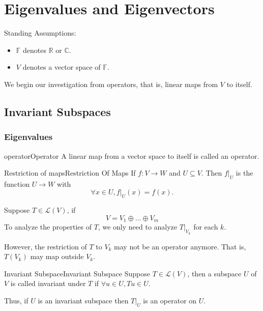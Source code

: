 \documentclass[../main.tex]{subfiles}
\begin{document}
\chapter{Eigenvalues and Eigenvectors}


\begin{plainblackenv}
Standing Assumptions:
\tcblower\par
\begin{itemize}
\item $\mathbb{F}$ denotes $\mathbb{R}$ or $\mathbb{C}$.
\item $V$ denotes a vector space of $\mathbb{F}$.
\end{itemize}
\end{plainblackenv}

We begin our investigation from operators, that is, linear maps from $V$ to itself.

\section{Invariant Subspaces}
\subsection{Eigenvalues}

\begin{definition}{operator}{Operator}
A linear map from a vector space to itself is called an operator.
\end{definition}

\begin{notation}{Restriction of maps}{Restriction Of Maps}
If $f:V \rightarrow  W$ and $U \subseteq V$. Then $f|_{U}$ is the function $U \rightarrow W$ with 
\begin{equation*}
\forall x\in U, f|_{U}(x) = f(x).
\end{equation*}
\end{notation}

Suppose $T\in \mathscr{L}(V)$, if
\begin{equation*}
V = V_1 \oplus  \ldots \oplus V_m
\end{equation*}
To analyze the properties of $T$, we only need to analyze $T|_{V_k}$ for each $k$.

However, the restriction of $T$ to $V_k$ may not be an operator anymore. That is, $T(V_k)$ may map outside  $V_k$.

\begin{definition}{Invariant Subspace}{Invariant Subspace}
Suppose $T\in \mathscr{L}(V)$, then a subspace $U$ of $V$ is called invariant under  $T$ if $\forall u \in U, Tu\in U$.
\end{definition}
Thus, if $U$ is an invariant subspace then $T|_{U}$ is an operator on $U$.
\end{document}
